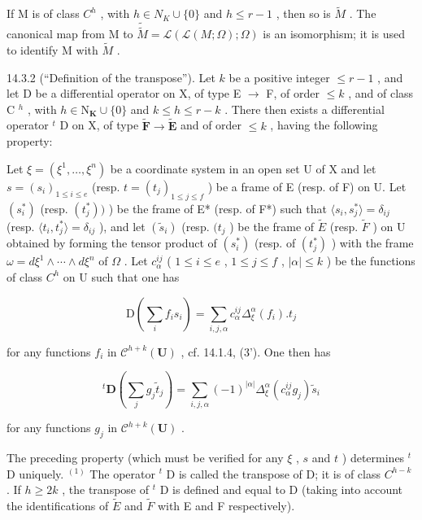 If M is of class \(C^{h}\) , with \(h \in N_{K} \cup \{0\}\) and \(h \leqslant r - 1\) , then so is \(\tilde{M}\) . The canonical map from M to \(\tilde{\tilde{M}} = \mathcal{L}(\mathcal{L}(M; \Omega); \Omega)\) is an isomorphism; it is used to identify M with \(\tilde{M}\) .

14.3.2 (“Definition of the transpose”). Let \(k\) be a positive integer \(\leqslant r - 1\) , and let D be a differential operator on X, of type E \(\rightarrow\) F, of order \(\leqslant k\) , and of class C \(^{h}\) , with \(h \in \mathrm{N}_{\mathbf{K}} \cup \{0\}\) and \(k \leqslant h \leqslant r - k\) . There then exists a differential operator \(^{t}\) D on X, of type \(\widetilde{\mathbf{F}} \to \widetilde{\mathbf{E}}\) and of order \(\leqslant k\) , having the following property:

Let \(\xi = (\xi^1, \ldots, \xi^n)\) be a coordinate system in an open set U of X and let \(s = (s_i)_{1 \leqslant i \leqslant e}\) (resp. \(t = (t_j)_{1 \leqslant j \leqslant f}\) ) be a frame of E (resp. of F) on U. Let \((s_i^*)\) (resp. \((t_j^*))\) ) be the frame of E* (resp. of F*) such that \(\langle s_i, s_j^* \rangle = \delta_{ij}\) (resp. \(\langle t_i, t_j^* \rangle = \delta_{ij}\) ), and let \((\tilde{s}_i)\) (resp. \((t_j\) ) be the frame of \(\tilde{E}\) (resp. \(\tilde{F}\) ) on U obtained by forming the tensor product of \((s_i^*)\) (resp. of \((t_j^*)\) ) with the frame \(\omega = d\xi^1 \wedge \cdots \wedge d\xi^n\) of \(\Omega\) . Let \(c_\alpha^{ij}\) ( \(1 \leqslant i \leqslant e\) , \(1 \leqslant j \leqslant f\) , \(|\alpha| \leqslant k\) ) be the functions of class \(C^h\) on U such that one has

\[
\mathrm{D} \left(\sum_ {i} f _ {i} s _ {i}\right) = \sum_ {i, j, \alpha} c _ {\alpha} ^ {i j} \Delta_ {\xi} ^ {\alpha} (f _ {i}). t _ {j}
\]

for any functions \(f_{i}\) in \(\mathcal{C}^{h+k}(\mathbf{U})\) , cf. 14.1.4, (3'). One then has

\[
{ } ^ { t } \mathbf { D } \left( \sum _ { j } g _ { j } \tilde { t } _ { j } \right) = \sum _ { i , j , \alpha } ( - 1 ) ^ { | \alpha | } \Delta _ { \xi } ^ { \alpha } ( c _ { \alpha } ^ { i j } g _ { j } ) \tilde { s } _ { i }
\]

for any functions \(g_{j}\) in \(\mathcal{C}^{h+k}(\mathbf{U})\) .

The preceding property (which must be verified for any \(\xi\) , \(s\) and \(t\) ) determines \(^{t}\) D uniquely. \(^{(1)}\) The operator \(^{t}\) D is called the transpose of D; it is of class \(C^{h-k}\) . If \(h \geqslant 2k\) , the transpose of \(^{t}\) D is defined and equal to D (taking into account the identifications of \(\tilde{E}\) and \(\tilde{F}\) with E and F respectively).

